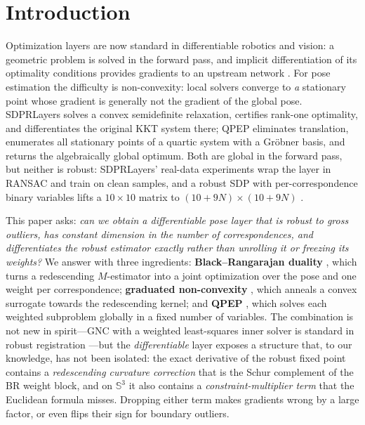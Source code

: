 \section{Introduction}

Optimization layers are now standard in differentiable robotics and vision: a geometric problem is
solved in the forward pass, and implicit differentiation of its optimality conditions provides
gradients to an upstream network \cite{holmes2025sdpr,pineda2022theseus,chen2020bpn}. For pose
estimation the difficulty is non-convexity: local solvers converge to \emph{a} stationary point
whose gradient is generally not the gradient of the global pose. SDPRLayers
\cite{holmes2025sdpr} solves a convex semidefinite relaxation, certifies rank-one optimality, and
differentiates the original KKT system there; QPEP \cite{wu2022qpep} eliminates translation,
enumerates all stationary points of a quartic system with a Gr\"obner basis, and returns the
algebraically global optimum. Both are global in the forward pass, but neither is robust: SDPRLayers'
real-data experiments wrap the layer in RANSAC \cite{fischler1981ransac} and train on clean samples,
and a robust SDP with per-correspondence binary variables lifts a $10\times10$ matrix to
$(10+9N)\times(10+9N)$ \cite{holmes2025sdpr}.

This paper asks: \emph{can we obtain a differentiable pose layer that is robust to gross outliers,
has constant dimension in the number of correspondences, and differentiates the robust estimator
exactly rather than unrolling it or freezing its weights?} We answer with three ingredients:
\textbf{Black--Rangarajan duality} \cite{black1996br}, which turns a redescending $M$-estimator
into a joint optimization over the pose and one weight per correspondence; \textbf{graduated
non-convexity} \cite{yang2020gnc,yang2020teaser}, which anneals a convex surrogate towards the
redescending kernel; and \textbf{QPEP} \cite{wu2022qpep}, which solves each weighted subproblem
globally in a fixed number of variables. The combination is not new in spirit---GNC with a weighted
least-squares inner solver is standard in robust registration \cite{yang2020gnc,yang2020teaser}---but
the \emph{differentiable} layer exposes a structure that, to our knowledge, has not been isolated:
the exact derivative of the robust fixed point contains a \emph{redescending curvature correction}
that is the Schur complement of the BR weight block, and on $\mathbb{S}^3$ it also contains a
\emph{constraint-multiplier term} that the Euclidean formula misses. Dropping either term makes
gradients wrong by a large factor, or even flips their sign for boundary outliers.

